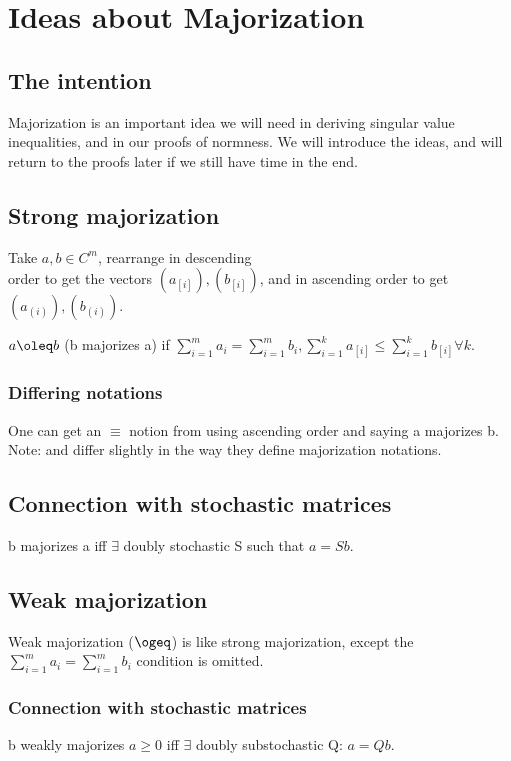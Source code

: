 \documentclass[10pt]{amsart}
\begin{document}
\section{Ideas about Majorization}
\subsection{The intention}
Majorization is an important idea we will need in deriving singular value inequalities, and in our proofs of normness. We will introduce the ideas, and will return to the proofs later if we still have time in the end.

\subsection{Strong majorization}
Take $a, b \in C^{m}$, rearrange in descending\\
 order to get the vectors $(a_{[i]}), (b_{[i]})$, and in ascending order to get $(a_{(i)}), (b_{(i)})$.

$a \oleq b$ (b majorizes a) if $\sum_{i=1}^{m} a_{i} = \sum_{i=1}^{m} b_{i}, \sum_{i=1}^{k}a_{[i]} \leq \sum_{i=1}^{k}b_{[i]} \forall k$.

\subsubsection{Differing notations}
One can get an $\equiv$ notion from using ascending order and saying a majorizes b. Note: \cite{hornJohnson} and \cite{hornJohnsonTopics} differ slightly in the way they define majorization notations.

\subsection{Connection with stochastic matrices}
b majorizes a iff $\exists$ doubly stochastic S such that $a = Sb$.

\subsection{Weak majorization}
Weak majorization ($\ogeq$) is like strong majorization, except the $\sum_{i=1}^{m} a_{i} = \sum_{i=1}^{m} b_{i}$ condition is omitted.

\subsubsection{Connection with stochastic matrices}
b weakly majorizes $a \geq 0$ iff $\exists$ doubly substochastic Q: $a = Qb$.
\end{document}
